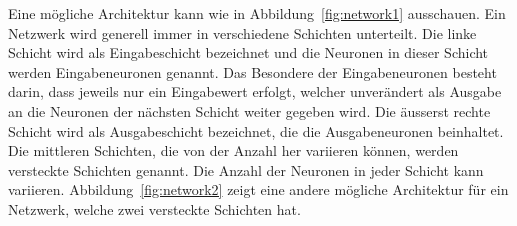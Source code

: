 \documentclass[12pt,a4paper]{report}
\begin{document}
Eine mögliche Architektur kann wie in  Abbildung~\ref{fig:network1} ausschauen.
Ein Netzwerk wird generell immer in verschiedene Schichten unterteilt.
Die linke Schicht wird als Eingabeschicht bezeichnet und die Neuronen in dieser Schicht werden Eingabeneuronen genannt.
Das Besondere der Eingabeneuronen besteht darin, dass jeweils nur ein Eingabewert erfolgt,
welcher unverändert als Ausgabe an die Neuronen der nächsten Schicht weiter gegeben wird.
Die äusserst rechte Schicht wird als Ausgabeschicht bezeichnet, die die Ausgabeneuronen beinhaltet.
Die mittleren Schichten, die von der Anzahl her variieren können, werden versteckte Schichten genannt.
Die Anzahl der Neuronen in jeder Schicht kann variieren.
Abbildung~\ref{fig:network2} zeigt eine andere mögliche Architektur für ein Netzwerk, welche zwei versteckte
Schichten hat.
\begin{figure}[h]
    \centering
{}
\end{figure}
\end{document}
